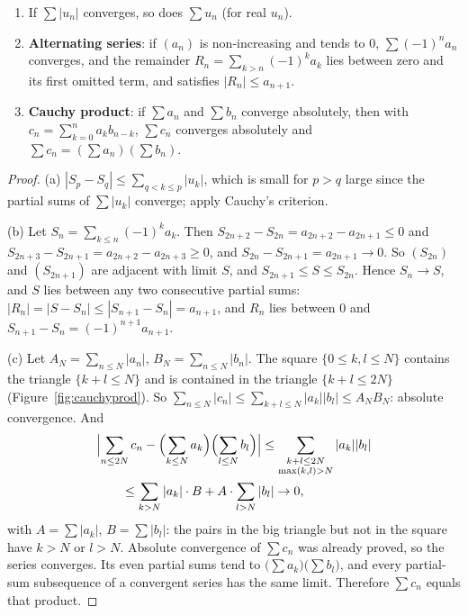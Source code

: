 \begin{proposition}\label{prop:signedseries}
\begin{enumerate}[label=(\alph*)]
\item If $\sum|u_n|$ converges, so does $\sum u_n$ (for real $u_n$).
\item \textbf{Alternating series}: if $(a_n)$ is non-increasing and tends to $0$, $\sum(-1)^na_n$ converges, and the remainder $R_n=\sum_{k>n}(-1)^ka_k$ lies between zero and its first omitted term, and satisfies $|R_n|\le a_{n+1}$.
\item \textbf{Cauchy product}: if $\sum a_n$ and $\sum b_n$ converge absolutely, then with $c_n=\sum_{k=0}^na_kb_{n-k}$, $\sum c_n$ converges absolutely and $\sum c_n=\left(\sum a_n\right)\left(\sum b_n\right)$.
\end{enumerate}
\end{proposition}
\begin{proof}
(a) $|S_p-S_q|\le\sum_{q<k\le p}|u_k|$, which is small for $p>q$ large since the partial sums of $\sum|u_k|$ converge; apply Cauchy's criterion.

(b) Let $S_n=\sum_{k\le n}(-1)^ka_k$. Then $S_{2n+2}-S_{2n}=a_{2n+2}-a_{2n+1}\le0$ and $S_{2n+3}-S_{2n+1}=a_{2n+2}-a_{2n+3}\ge0$, and $S_{2n}-S_{2n+1}=a_{2n+1}\to0$. So $(S_{2n})$ and $(S_{2n+1})$ are adjacent with limit $S$, and $S_{2n+1}\le S\le S_{2n}$. Hence $S_n\to S$, and $S$ lies between any two consecutive partial sums: $|R_n|=|S-S_n|\le|S_{n+1}-S_n|=a_{n+1}$, and $R_n$ lies between $0$ and $S_{n+1}-S_n=(-1)^{n+1}a_{n+1}$.

(c) Let $A_N=\sum_{n\le N}|a_n|$, $B_N=\sum_{n\le N}|b_n|$. The square $\{0\le k,l\le N\}$ contains the triangle $\{k+l\le N\}$ and is contained in the triangle $\{k+l\le2N\}$ (Figure~\ref{fig:cauchyprod}). So $\sum_{n\le N}|c_n|\le\sum_{k+l\le N}|a_k||b_l|\le A_NB_N$: absolute convergence. And
\[
\begin{aligned}&\Bigl|\sum_{n\le2N}c_n-\Bigl(\sum_{k\le N}a_k\Bigr)\Bigl(\sum_{l\le N}b_l\Bigr)\Bigr|\le\sum_{\substack{k+l\le2N\\ \max(k,l)>N}}|a_k||b_l|\\&\qquad\le\sum_{k>N}|a_k|\cdot B+A\cdot\sum_{l>N}|b_l|\to0,\end{aligned}
\]
with $A=\sum|a_k|$, $B=\sum|b_l|$: the pairs in the big triangle but not in the square have $k>N$ or $l>N$. Absolute convergence of $\sum c_n$ was already proved, so the series converges. Its even partial sums tend to $\bigl(\sum a_k\bigr)\bigl(\sum b_l\bigr)$, and every partial-sum subsequence of a convergent series has the same limit. Therefore $\sum c_n$ equals that product.
\end{proof}

